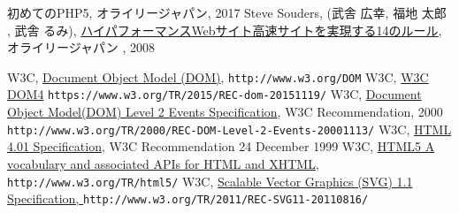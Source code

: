 \begin{thebibliography}{99}
	 {初めてのPHP5}, オライリージャパン, 2017
\fi
\ifSeminor
\else
 Steve Souders,  (武舎 広幸, 福地 太郎 , 武舎 るみ),
\href{http://www.amazon.co.jp/%E3%83%8F%E3%82%A4%E3%83%91%E3%83%95%E3%82%A9%E3%83%BC%E3%83%9E%E3%83%B3%E3%82%B9Web%E3%82%B5%E3%82%A4%E3%83%88-%E2%80%95%E9%AB%98%E9%80%9F%E3%82%B5%E3%82%A4%E3%83%88%E3%82%92%E5%AE%9F%E7%8F%BE%E3%81%99%E3%82%8B14%E3%81%AE%E3%83%AB%E3%83%BC%E3%83%AB-Steve-Souders/dp/487311361X/ref=sr_1_1?ie=UTF8&qid=1304731142&sr=8-1}
{ハイパフォーマンスWebサイト\newline 高速サイトを実現する14のルール},オライリージャパン , 2008
\fi
\iffalse
 \bibitem{Stark}Jonathan Stark(増井 俊之, 牧野 聡 訳),\\
\href{http://www.amazon.co.jp/gp/product/4873114616/ref=cm_cr_asin_lnk}
{iPhoneアプリケーション開発ガイド　 HTML+CSS+JavaScript による開発手法},
オライリージャパン, 2010
\fi
 W3C, \href{http://www.w3.org/DOM}{Document Object Model (DOM)},
	 {\texttt{http://www.w3.org/DOM}}
 W3C,
				 \href{https://www.w3.org/TR/2015/REC-dom-20151119/}{W3C DOM4}
				 {\texttt{https://www.w3.org/TR/2015/REC-dom-20151119/}}
 W3C, 
\href{http://www.w3.org/TR/2000/REC-DOM-Level-2-Events-20001113/}
{Document Object Model(DOM) Level 2 Events Specification},
    W3C Recommendation, 2000
\texttt{http://www.w3.org/TR/2000/REC-DOM-Level-2-Events-20001113/}
 W3C, 
\href{http://www.w3.org/TR/html401/}
{HTML 4.01 Specification}, W3C Recommendation 24 December 1999
 W3C, \href{http://www.w3.org/TR/html5/}{HTML5
A vocabulary and associated APIs for HTML and XHTML}, \newline\texttt{http://www.w3.org/TR/html5/}
 W3C, \href{http://www.w3.org/TR/2011/REC-SVG11-20110816/}
      {Scalable Vector Graphics (SVG) 1.1 Specification, \protect\newline}
             {\texttt{http://www.w3.org/TR/2011/REC-SVG11-20110816/}}


\end{thebibliography}
